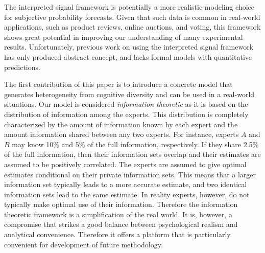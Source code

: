 \documentclass[11pt,twoside]{article}
\begin{document}


The interpreted signal framework is potentially  a more realistic modeling choice
for subjective probability forecasts. Given that such data is
common in real-world applications, such as product reviews,
online auctions, and voting, this framework shows great potential in
improving our understanding of many experimental
results. Unfortunately, previous work  on using the interpreted signal framework has only produced
abstract concept, and lacks formal models with quantitative predictions.


The first contribution of this paper is to introduce a concrete model that generates heterogeneity from cognitive diversity and can be used in a real-world situations. 
Our model is considered \textit{information theoretic} as it is based on the distribution of information among the experts. This distribution is completely characterized by the amount of information known by each expert and the amount information shared between any two experts. For instance, experts $A$ and $B$ may know 10\% and 5\%  of the full information, respectively. If they share 2.5\% of the full information, then their information sets overlap and their estimates are assumed to be positively correlated. The experts are assumed to give optimal estimates conditional on their private information sets. This means that a larger information set typically leads to a more accurate estimate, and two identical information sets lead to the same estimate. In reality experts, however, do not typically make optimal use of their information. Therefore the information theoretic framework is a simplification of the real world. It is, however, a compromise that strikes a good balance between psychological realism and analytical convenience. Therefore it offers a platform that is particularly convenient for development of future methodology.
\end{document}
